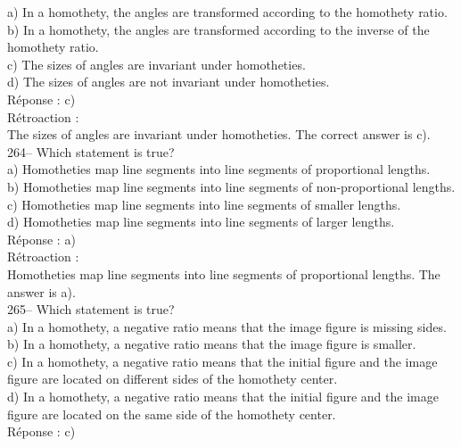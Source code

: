 \documentclass[letterpaper, 12pt]{article}
\begin{document}
a) In a homothety, the angles are transformed according to the
homothety ratio.\\
b) In a homothety, the angles are transformed according to the
inverse of the homothety ratio.\\
c) The sizes of angles are invariant under homotheties.\\
d) The sizes of angles are not invariant under homotheties.\\

R\'eponse : c)\\

R\'etroaction :\\
The sizes of angles are invariant under homotheties. The correct
answer is c). \\

264-- Which statement is true?\\

a) Homotheties map line segments into line segments of
proportional lengths.\\
b) Homotheties map line segments into line segments of
non-proportional lengths.\\
c) Homotheties map line segments into line segments of smaller
lengths.\\
d) Homotheties map line segments into line segments of larger
lengths.\\

R\'eponse : a)\\

R\'etroaction :\\
Homotheties map line segments into line segments of proportional
lengths. The answer is a).\\

265-- Which statement is true?\\

a) In a homothety, a negative ratio means that the image figure is
missing sides.\\
b) In a homothety, a negative ratio means that the image figure is
smaller.\\
c) In a homothety, a negative ratio means that the initial figure
and the image figure are located on different sides of the homothety
center.\\
d) In a homothety, a negative ratio means that the initial figure
and the image figure are located on the same side of the homothety
center.\\

R\'eponse : c)\\
\end{document}
